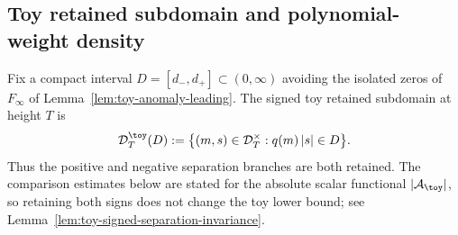 %


\subsection{Toy retained subdomain and polynomial-weight density}
\label{subsec:toy-retained-subdomain}

\begin{definition}
\label{def:toy-retained-subdomain}
Fix a compact interval \(D=[d_-,d_+]\subset(0,\infty)\) avoiding the
isolated zeros of \(F_{\infty}\) of
Lemma~\ref{lem:toy-anomaly-leading}.  The signed toy retained subdomain
at height \(T\) is
\begin{equation}
\label{eq:toy-retained-subdomain}
        \mathcal D_T^\toy(D)
        :=\bigl\{(m,s)\in\mathcal D_T^\times:
              q(m)\,|s|\in D\bigr\}.
\end{equation}
Thus the positive and negative separation branches are both retained.
The comparison estimates below are stated for the absolute scalar
functional \(|\mathcal A_\toy|\), so retaining both signs does not change
the toy lower bound; see Lemma~\ref{lem:toy-signed-separation-invariance}.
\end{definition}

